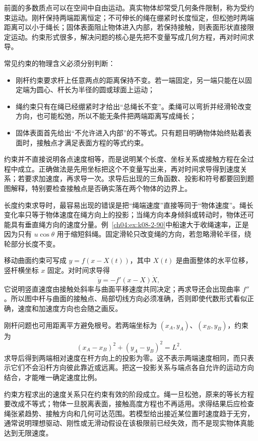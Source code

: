 {前面的多数质点可以在空间中自由运动。真实物体却常受几何条件限制，称为受约束运动。刚杆保持两端距离恒定；不可伸长的绳在绷紧时长度恒定，但松弛时两端距离可以小于绳长；固体表面阻止物体进入内部，若保持接触，则表面形状直接限定运动。约束形式很多，解决问题的核心是先把不变量写成几何方程，再对时间求导。

常见约束的物理含义必须分别判断：
\begin{itemize}
\item 刚杆约束要求杆上任意两点的距离保持不变。若一端固定，另一端只能在以固定端为圆心、杆长为半径的圆或球面上运动；
\item 绳约束只有在绳已经绷紧时才给出“总绳长不变”。柔绳可以弯折并经滑轮改变方向，也可能松弛，所以不能无条件把两端距离写成绳长；
\item 固体表面首先给出“不允许进入内部”的不等式。只有题目明确物体始终贴着表面时，接触点才满足表面方程的等式约束。
\end{itemize}

约束并不直接说明各点速度相等，而是说明某个长度、坐标关系或接触方程在全过程中成立。正确做法是先用坐标把这个不变量写出来，再对时间求导得到速度关系；若要求加速度，再求导一次。求导后出现的三角函数、投影和符号都要回到题图解释，特别要检查接触点是否确实落在两个物体的边界上。

长度约束求导时，最容易出现的错误是把“绳端速度”直接等同于“物体速度”。绳长变化率只等于物体速度在绳方向上的投影；当绳方向本身倾斜或转动时，物体还可能具有垂直绳方向的速度分量。例~\ref{ch04:ex:k08-2-90}中船速大于收绳速率，正是因为只有 $u\cos\theta$ 用于缩短斜绳。固定滑轮只改变绳的方向，若忽略滑轮半径，绕轮部分长度不变。

移动曲面约束可写成 $y=f(x-X(t))$，其中 $X(t)$ 是曲面整体的水平位移，竖杆横坐标 $x$ 固定。对时间求导得
\begin{equation}
 \dot y=-f'(x-X)\dot X,
\end{equation}
它说明竖直速度由接触处斜率与曲面平移速度共同决定；再求导还会出现曲率 $f''$。所以图中杆与曲面的接触点、局部切线方向必须准确，否则即使代数形式看似正确，速度和加速度方向也会随之画反。

刚杆问题也可用距离平方避免根号。若两端坐标为 $(x_A,y_A)$、$(x_B,y_B)$，约束为
\begin{equation}
 (x_A-x_B)^2+(y_A-y_B)^2=L^2.
\end{equation}
求导后得到两端相对速度在杆方向上的投影为零。这不表示两端速度相同，而只表示它们不会沿杆方向彼此靠近或远离。把这一投影关系与端点各自允许的运动方向结合，才能唯一确定速度比例。

约束方程求出的速度关系只在约束有效的阶段成立。绳一旦松弛，原来的等长方程要改成不等式；物体一旦脱离表面，接触高度方程也不再适用。求得结果后应检查绳张紧趋势、接触方向和几何可达范围。若模型给出接近某位置时速度趋于无穷，通常说明理想驱动、刚性或无滑动假设在该极限前已经失效，而不是现实物体真能达到无限速度。

}
